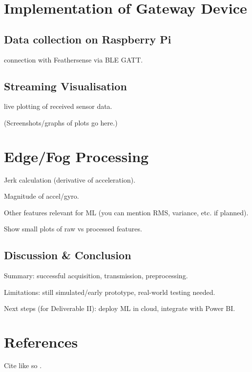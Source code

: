 \documentclass[conference]{lib/IEEEtran}
\begin{document}
\section{Implementation of Gateway Device}
\subsection{Data collection on Raspberry Pi}
connection with Feathersense via BLE GATT.

\subsection{Streaming Visualisation}
 live plotting of received sensor data.

(Screenshots/graphs of plots go here.)

\section{Edge/Fog Processing}
Jerk calculation (derivative of acceleration).

Magnitude of accel/gyro.

Other features relevant for ML (you can mention RMS, variance, etc. if planned).

Show small plots of raw vs processed features.


\subsection{Discussion \& Conclusion}
Summary: successful acquisition, transmission, preprocessing.

Limitations: still simulated/early prototype, real-world testing needed.

Next steps (for Deliverable II): deploy ML in cloud, integrate with Power BI.


\section*{References}

Cite like so \cite{b6}.
\end{document}
